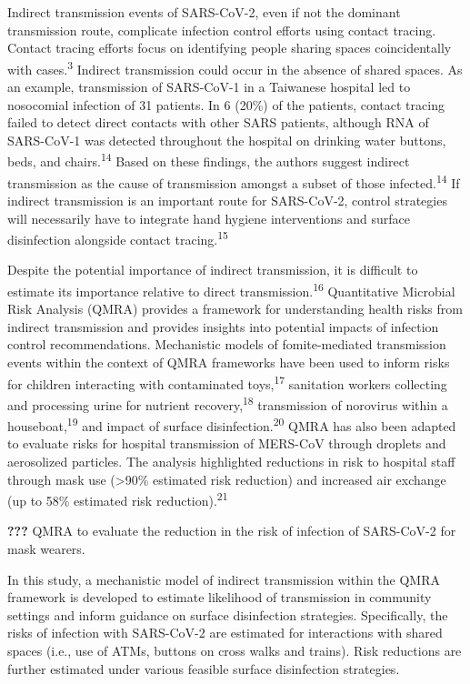 \documentclass[journal=jacsat,manuscript=article]{achemso}
\begin{document}
Indirect transmission events of SARS-CoV-2, even if not the dominant
transmission route, complicate infection control efforts using contact
tracing. Contact tracing efforts focus on identifying people sharing
spaces coincidentally with cases.\textsuperscript{3} Indirect
transmission could occur in the absence of shared spaces. As an example,
transmission of SARS-CoV-1 in a Taiwanese hospital led to nosocomial
infection of 31 patients. In 6 (20\%) of the patients, contact tracing
failed to detect direct contacts with other SARS patients, although RNA
of SARS-CoV-1 was detected throughout the hospital on drinking water
buttons, beds, and chairs.\textsuperscript{14} Based on these findings,
the authors suggest indirect transmission as the cause of transmission
amongst a subset of those infected.\textsuperscript{14} If indirect
transmission is an important route for SARS-CoV-2, control strategies
will necessarily have to integrate hand hygiene interventions and
surface disinfection alongside contact tracing.\textsuperscript{15}

Despite the potential importance of indirect transmission, it is
difficult to estimate its importance relative to direct
transmission.\textsuperscript{16} Quantitative Microbial Risk Analysis
(QMRA) provides a framework for understanding health risks from indirect
transmission and provides insights into potential impacts of infection
control recommendations. Mechanistic models of fomite-mediated
transmission events within the context of QMRA frameworks have been used
to inform risks for children interacting with contaminated
toys,\textsuperscript{17} sanitation workers collecting and processing
urine for nutrient recovery,\textsuperscript{18} transmission of
norovirus within a houseboat,\textsuperscript{19} and impact of surface
disinfection.\textsuperscript{20} QMRA has also been adapted to evaluate
risks for hospital transmission of MERS-CoV through droplets and
aerosolized particles. The analysis highlighted reductions in risk to
hospital staff through mask use (\textgreater90\% estimated risk
reduction) and increased air exchange (up to 58\% estimated risk
reduction).\textsuperscript{21}

\textbf{???} QMRA to evaluate the reduction in the risk of infection of
SARS-CoV-2 for mask wearers.

In this study, a mechanistic model of indirect transmission within the
QMRA framework is developed to estimate likelihood of transmission in
community settings and inform guidance on surface disinfection
strategies. Specifically, the risks of infection with SARS-CoV-2 are
estimated for interactions with shared spaces (i.e., use of ATMs,
buttons on cross walks and trains). Risk reductions are further
estimated under various feasible surface disinfection strategies.
\end{document}
